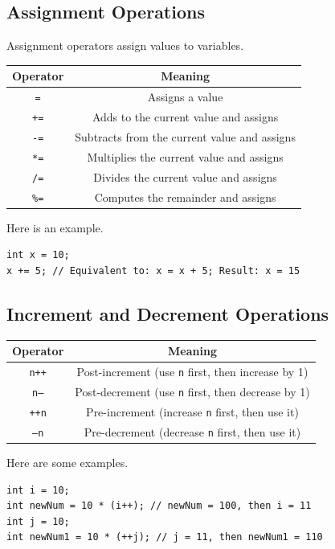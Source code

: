\documentclass[letterpaper,12pt]{article}
\begin{document}
\subsection{Assignment Operations}
Assignment operators assign values to variables.
\begin{center}
\noindent
\begin{tabular}{|c|c|}
    \hline
    \textbf{Operator} & \textbf{Meaning} \\ \hline
    \texttt{=} & Assigns a value \\ \hline
    \texttt{+=} & Adds to the current value and assigns \\ \hline
    \texttt{-=} & Subtracts from the current value and assigns \\ \hline
    \texttt{*=} & Multiplies the current value and assigns \\ \hline
    \texttt{/=} & Divides the current value and assigns \\ \hline
    \texttt{\%=} & Computes the remainder and assigns \\ \hline
\end{tabular}
\end{center}
Here is an example.
\begin{verbatim}
int x = 10;
x += 5; // Equivalent to: x = x + 5; Result: x = 15
\end{verbatim}
\subsection{Increment and Decrement Operations}
\begin{center}
\noindent
\begin{tabular}{|c|c|}
    \hline
    \textbf{Operator} & \textbf{Meaning} \\ \hline
    \texttt{n++} & Post-increment (use \texttt{n} first, then increase by 1) \\ \hline
    \texttt{n--} & Post-decrement (use \texttt{n} first, then decrease by 1) \\ \hline
    \texttt{++n} & Pre-increment (increase \texttt{n} first, then use it) \\ \hline
    \texttt{--n} & Pre-decrement (decrease \texttt{n} first, then use it) \\ \hline
\end{tabular}
\end{center}
Here are some examples.
\begin{verbatim}
int i = 10;
int newNum = 10 * (i++); // newNum = 100, then i = 11
int j = 10;
int newNum1 = 10 * (++j); // j = 11, then newNum1 = 110
\end{verbatim}
\end{document}
